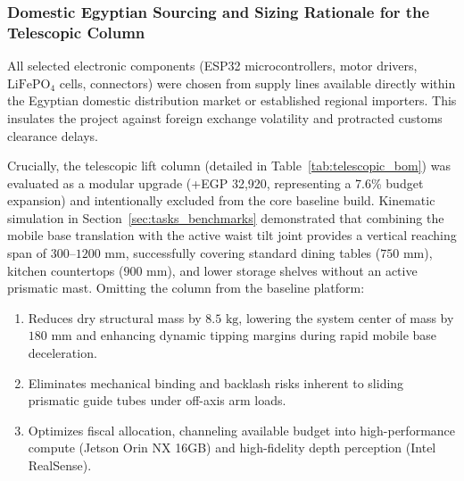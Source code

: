 \subsubsection{Domestic Egyptian Sourcing and Sizing Rationale for the Telescopic Column}
All selected electronic components (ESP32 microcontrollers, motor drivers, $\text{LiFePO}_4$ cells, connectors) were chosen from supply lines available directly within the Egyptian domestic distribution market or established regional importers. This insulates the project against foreign exchange volatility and protracted customs clearance delays.

Crucially, the telescopic lift column (detailed in Table~\ref{tab:telescopic_bom}) was evaluated as a modular upgrade (+EGP 32,920, representing a 7.6\% budget expansion) and intentionally excluded from the core baseline build. Kinematic simulation in Section~\ref{sec:tasks_benchmarks} demonstrated that combining the mobile base translation with the active waist tilt joint provides a vertical reaching span of $300\text{--}1200\text{ mm}$, successfully covering standard dining tables ($750\text{ mm}$), kitchen countertops ($900\text{ mm}$), and lower storage shelves without an active prismatic mast. Omitting the column from the baseline platform:
\begin{enumerate}[leftmargin=1.5em]
  \item Reduces dry structural mass by $8.5\text{ kg}$, lowering the system center of mass by $180\text{ mm}$ and enhancing dynamic tipping margins during rapid mobile base deceleration.
  \item Eliminates mechanical binding and backlash risks inherent to sliding prismatic guide tubes under off-axis arm loads.
  \item Optimizes fiscal allocation, channeling available budget into high-performance compute (Jetson Orin NX 16GB) and high-fidelity depth perception (Intel RealSense).
\end{enumerate}


